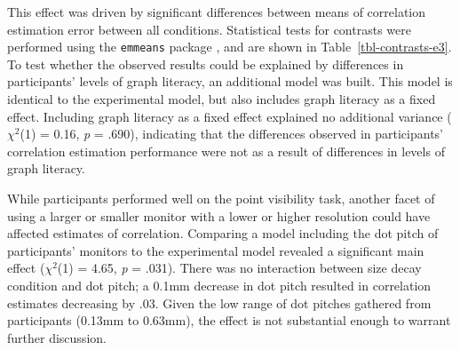 \documentclass[../main.tex]{subfiles}
\begin{document}
\begin{table}

\caption{\label{tbl-contrasts-e3}Contrasts between different levels of
the size decay factor in Experiment 3.}


\end{table}%

This effect was driven by significant differences between means of
correlation estimation error between all conditions. Statistical tests
for contrasts were performed using the \texttt{emmeans} package
\cite{lenth_2024}, and are shown in Table~\ref{tbl-contrasts-e3}. To
test whether the observed results could be explained by differences in
participants' levels of graph literacy, an additional model was built.
This model is identical to the experimental model, but also includes
graph literacy as a fixed effect. Including graph literacy as a fixed
effect explained no additional variance (\(\chi^2\)(1) = 0.16, \emph{p}
= .690), indicating that the differences observed in participants'
correlation estimation performance were not as a result of differences
in levels of graph literacy.

While participants performed well on the point visibility task, another
facet of using a larger or smaller monitor with a lower or higher
resolution could have affected estimates of correlation. Comparing a
model including the dot pitch of participants' monitors to the
experimental model revealed a significant main effect (\(\chi^2\)(1) =
4.65, \emph{p} = .031). There was no interaction between size decay
condition and dot pitch; a 0.1mm decrease in dot pitch resulted in
correlation estimates decreasing by .03. Given the low range of dot
pitches gathered from participants (0.13mm to 0.63mm), the effect is not
substantial enough to warrant further discussion.
\end{document}
